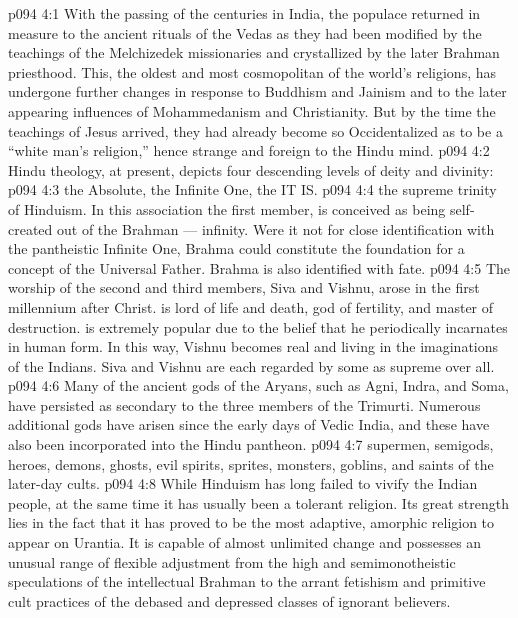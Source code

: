 \vs p094 4:1 With the passing of the centuries in India, the populace returned in measure to the ancient rituals of the Vedas as they had been modified by the teachings of the Melchizedek missionaries and crystallized by the later Brahman priesthood. This, the oldest and most cosmopolitan of the world’s religions, has undergone further changes in response to Buddhism and Jainism and to the later appearing influences of Mohammedanism and Christianity. But by the time the teachings of Jesus arrived, they had already become so Occidentalized as to be a “white man’s religion,” hence strange and foreign to the Hindu mind.
\vs p094 4:2 \pc Hindu theology, at present, depicts four descending levels of deity and divinity:
\vs p094 4:3 \bibnobreakspace {} the Absolute, the Infinite One, the IT IS.
\vs p094 4:4 \bibnobreakspace {} the supreme trinity of Hinduism. In this association  the first member, is conceived as being self\hyp{}created out of the Brahman --- infinity. Were it not for close identification with the pantheistic Infinite One, Brahma could constitute the foundation for a concept of the Universal Father. Brahma is also identified with fate.
\vs p094 4:5 The worship of the second and third members, Siva and Vishnu, arose in the first millennium after Christ.  is lord of life and death, god of fertility, and master of destruction.  is extremely popular due to the belief that he periodically incarnates in human form. In this way, Vishnu becomes real and living in the imaginations of the Indians. Siva and Vishnu are each regarded by some as supreme over all.
\vs p094 4:6 \bibnobreakspace {} Many of the ancient gods of the Aryans, such as Agni, Indra, and Soma, have persisted as secondary to the three members of the Trimurti. Numerous additional gods have arisen since the early days of Vedic India, and these have also been incorporated into the Hindu pantheon.
\vs p094 4:7 \bibnobreakspace {} supermen, semigods, heroes, demons, ghosts, evil spirits, sprites, monsters, goblins, and saints of the later\hyp{}day cults.
\vs p094 4:8 \pc While Hinduism has long failed to vivify the Indian people, at the same time it has usually been a tolerant religion. Its great strength lies in the fact that it has proved to be the most adaptive, amorphic religion to appear on Urantia. It is capable of almost unlimited change and possesses an unusual range of flexible adjustment from the high and semimonotheistic speculations of the intellectual Brahman to the arrant fetishism and primitive cult practices of the debased and depressed classes of ignorant believers.
